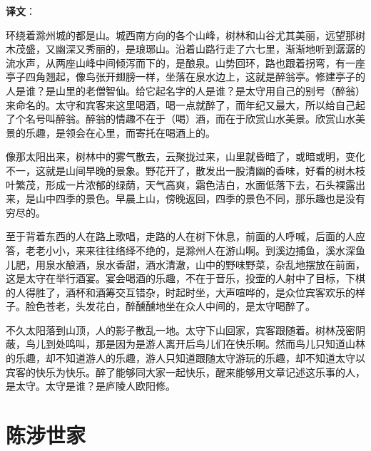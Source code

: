 \documentclass[12pt,UTF-8,openany]{ctexbook}
\begin{document}
\newpage

\textbf{译文}：

\vspace{1em}

\begin{normalsize}
    
    环绕着滁州城的都是山。城西南方向的各个山峰，树林和山谷尤其美丽，远望那树木茂盛，又幽深又秀丽的，是琅琊山。沿着山路行走了六七里，渐渐地听到潺潺的流水声，从两座山峰中间倾泻而下的，是酿泉。山势回环，路也跟着拐弯，有一座亭子四角翘起，像鸟张开翅膀一样，坐落在泉水边上，这就是醉翁亭。修建亭子的人是谁？是山里的老僧智仙。给它起名字的人是谁？是太守用自己的别号（醉翁）来命名的。太守和宾客来这里喝酒，喝一点就醉了，而年纪又最大，所以给自己起了个名号叫醉翁。醉翁的情趣不在于（喝）酒，而在于欣赏山水美景。欣赏山水美景的乐趣，是领会在心里，而寄托在喝酒上的。
    
    像那太阳出来，树林中的雾气散去，云聚拢过来，山里就昏暗了，或暗或明，变化不一，这就是山间早晚的景象。野花开了，散发出一股清幽的香味，好看的树木枝叶繁茂，形成一片浓郁的绿荫，天气高爽，霜色洁白，水面低落下去，石头裸露出来，是山中四季的景色。早晨上山，傍晚返回，四季的景色不同，那乐趣也是没有穷尽的。
    
    至于背着东西的人在路上歌唱，走路的人在树下休息，前面的人呼喊，后面的人应答，老老小小，来来往往络绎不绝的，是滁州人在游山啊。到溪边捕鱼，溪水深鱼儿肥，用泉水酿酒，泉水香甜，酒水清澈，山中的野味野菜，杂乱地摆放在前面，这是太守在举行酒宴。宴会喝酒的乐趣，不在于音乐，投壶的人射中了目标，下棋的人得胜了，酒杯和酒筹交互错杂，时起时坐，大声喧哗的，是众位宾客欢乐的样子。脸色苍老，头发花白，醉醺醺地坐在众人中间的，是太守喝醉了。
    
    不久太阳落到山顶，人的影子散乱一地。太守下山回家，宾客跟随着。树林茂密阴蔽，鸟儿到处鸣叫，那是因为是游人离开后鸟儿们在快乐啊。然而鸟儿只知道山林的乐趣，却不知道游人的乐趣，游人只知道跟随太守游玩的乐趣，却不知道太守以宾客的快乐为快乐。醉了能够同大家一起快乐，醒来能够用文章记述这乐事的人，是太守。太守是谁？是庐陵人欧阳修。
    
\end{normalsize}



\chapter{陈涉世家}
\end{document}
